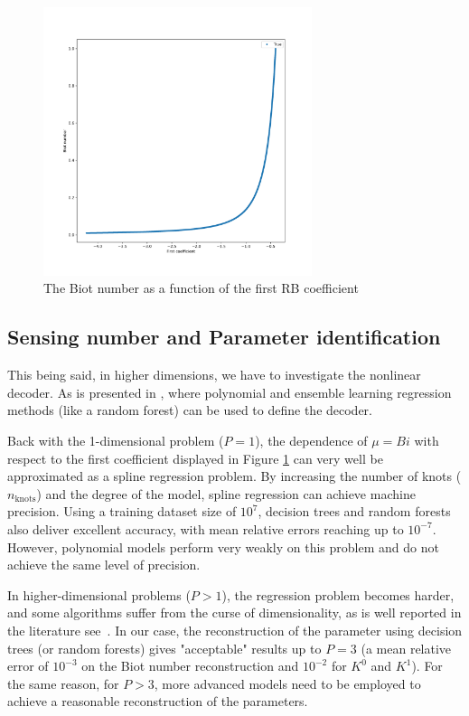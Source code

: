 \documentclass[graybox]{svmult}
\begin{document}
\begin{figure}[!htbp]
    \centering
\includegraphics[width=0.7\textwidth] {dataP1Inverse.png}
    \caption{ The Biot number as a function of the first RB coefficient}
    \label{fig:dataP1Inverse}
\end{figure}

\subsection{Sensing number and Parameter identification}
\label{subsec:3.3}

This being said, in higher dimensions, we have to investigate the nonlinear decoder. As is presented in \cite {barnett2022quadratic, barnett2023, cohen2023nonlinear}, where polynomial and ensemble learning regression methods (like a random forest) can be used to define the decoder.


Back with the 1-dimensional problem ($P=1$),  the dependence of $\mu = Bi$ with respect to the first coefficient displayed 
in Figure \ref{fig:dataP1Inverse}
 can very well be approximated as a spline regression problem. By increasing the number of knots ($n_{\text{knots}}$) and the degree of the model, spline regression can achieve machine precision. Using a training dataset size of $10^7$, decision trees and random forests also deliver excellent accuracy, with mean relative errors reaching up to $10^{-7}$. However, polynomial models perform very weakly on this problem and do not achieve the same level of precision.

In higher-dimensional problems ($P>1$), the regression problem becomes harder, and some algorithms suffer from the curse of dimensionality, as is well reported in the literature
see~\cite{curse}. In our case, the reconstruction of the parameter using decision trees (or random forests) gives "acceptable" results up to $P=3$ (a mean relative error of $10^{-3}$ on the Biot number reconstruction and $10^{-2}$ for $K^0$ and $K^1$). For the same reason, for $P>3$, more advanced models need to be employed to achieve a reasonable reconstruction of the parameters.
\end{document}
